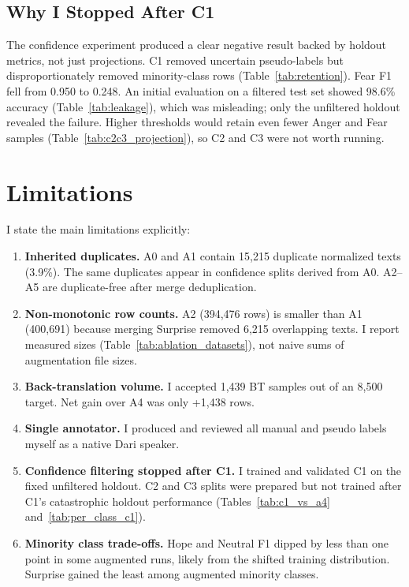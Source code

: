 \documentclass[11pt,a4paper]{article}
\begin{document}
\subsection{Why I Stopped After C1}

The confidence experiment produced a clear negative result backed by holdout metrics, not just projections. C1 removed uncertain pseudo-labels but disproportionately removed minority-class rows (Table~\ref{tab:retention}). Fear F1 fell from 0.950 to 0.248. An initial evaluation on a filtered test set showed 98.6\% accuracy (Table~\ref{tab:leakage}), which was misleading; only the unfiltered holdout revealed the failure. Higher thresholds would retain even fewer Anger and Fear samples (Table~\ref{tab:c2c3_projection}), so C2 and C3 were not worth running.

\section{Limitations}
\label{sec:limitations}

I state the main limitations explicitly:

\begin{enumerate}
    \item \textbf{Inherited duplicates.} A0 and A1 contain 15,215 duplicate normalized texts (3.9\%). The same duplicates appear in confidence splits derived from A0. A2--A5 are duplicate-free after merge deduplication.
    \item \textbf{Non-monotonic row counts.} A2 (394,476 rows) is smaller than A1 (400,691) because merging Surprise removed 6,215 overlapping texts. I report measured sizes (Table~\ref{tab:ablation_datasets}), not naive sums of augmentation file sizes.
    \item \textbf{Back-translation volume.} I accepted 1,439 BT samples out of an 8,500 target. Net gain over A4 was only +1,438 rows.
    \item \textbf{Single annotator.} I produced and reviewed all manual and pseudo labels myself as a native Dari speaker.
    \item \textbf{Confidence filtering stopped after C1.} I trained and validated C1 on the fixed unfiltered holdout. C2 and C3 splits were prepared but not trained after C1's catastrophic holdout performance (Tables~\ref{tab:c1_vs_a4} and~\ref{tab:per_class_c1}).
    \item \textbf{Minority class trade-offs.} Hope and Neutral F1 dipped by less than one point in some augmented runs, likely from the shifted training distribution. Surprise gained the least among augmented minority classes.
\end{enumerate}
\end{document}
